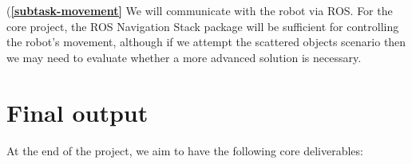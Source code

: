 \documentclass[a4paper,11pt,english]{article}
\begin{document}

(\textbf{\ref{subtask-movement}}
We will communicate with the robot via ROS.
For the core project, the ROS Navigation Stack\cite{ROSWikiNavigation} package will be sufficient for controlling the robot's movement, although if we attempt the scattered objects scenario then we may need to evaluate whether a more advanced solution is necessary.

\section{Final output}\label{finaloutput}

At the end of the project, we aim to have the following core deliverables:
\end{document}
